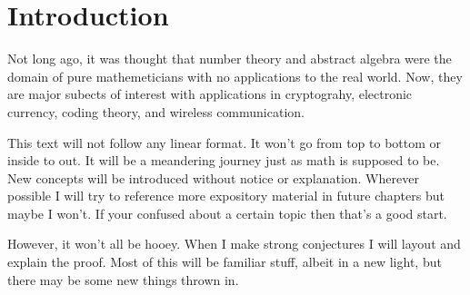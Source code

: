 \chapter{Introduction}
Not long ago, it was thought that number theory and abstract algebra were the
domain of pure mathemeticians with no applications to the real world. Now, they
are major subects of interest with applications in cryptograhy, electronic
currency, coding theory, and wireless communication.

This text will not follow any linear format. It won't go from top to bottom
or inside to out. It will be a meandering journey just as math is supposed to
be. New concepts will be introduced without notice or explanation. Wherever
possible I will try to reference more expository material in future chapters 
but maybe I won't. If your confused about a certain topic then that's a good
start.

However, it won't all be hooey. When I make strong conjectures I will layout 
and explain the proof. Most of this will be familiar stuff, albeit in a new light, but there may be some new things thrown in.

